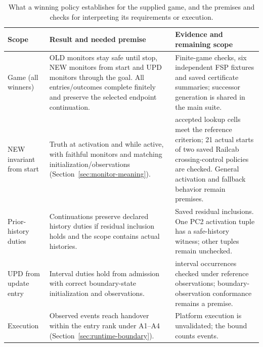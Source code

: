 \begin{table}[!htbp]
\caption{What a winning policy establishes for the supplied game, and the premises and checks for interpreting its requirements or execution.}
\label{tab:guarantee-routes}
\centering\small
\begin{tabular}{@{}>{\raggedright\arraybackslash}p{.15\linewidth}>{\raggedright\arraybackslash}p{.38\linewidth}>{\raggedright\arraybackslash}p{.41\linewidth}@{}}\toprule
Scope & Result and needed premise & Evidence and remaining scope\\\midrule
Game (all winners) & OLD monitors stay safe until stop, NEW monitors from start and UPD monitors through the goal. All entries/outcomes complete finitely and preserve the selected endpoint continuation. & Finite-game checks, six independent FSP fixtures and saved certificate summaries; successor generation is shared in the main suite.\\[4pt]
NEW invariant from start & Truth at activation and while active, with faithful monitors and matching initialization/observations (Section~\ref{sec:monitor-meaning}). & 900 accepted lookup cells meet the reference criterion; 21 actual starts of two saved Railcab crossing-control policies are checked. General activation and fallback behavior remain premises.\\[4pt]
Prior-history duties & Continuations preserve declared history duties if residual inclusion holds and the scope contains actual histories. & Saved residual inclusions. One PC2 activation tuple has a safe-history witness; other tuples remain unchecked.\\[4pt]
UPD from update entry & Interval duties hold from admission with correct boundary-state initialization and observations. & 135 interval occurrences checked under reference observations; boundary-observation conformance remains a premise.\\[4pt]
Execution & Observed events reach handover within the entry rank under A1--A4 (Section~\ref{sec:runtime-boundary}). & Platform execution is unvalidated; the bound counts events.\\\bottomrule
\end{tabular}
\end{table}
